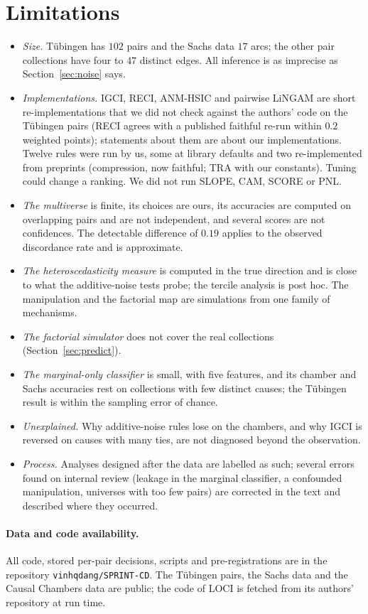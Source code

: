 \section{Limitations}\label{sec:limits}
\begin{itemize}
\item \emph{Size.} T\"ubingen has $102$ pairs and the Sachs data $17$ arcs; the other pair collections have four to $47$ distinct edges. All inference is as imprecise as Section~\ref{sec:noise} says.
\item \emph{Implementations.} IGCI, RECI, ANM-HSIC and pairwise LiNGAM are short re-implementations that we did not check against the authors' code on the T\"ubingen pairs (RECI agrees with a published faithful re-run within $0.2$ weighted points); statements about them are about our implementations. Twelve rules were run by us, some at library defaults and two re-implemented from preprints (compression, now faithful; TRA with our constants). Tuning could change a ranking. We did not run SLOPE, CAM, SCORE or PNL.
\item \emph{The multiverse} is finite, its choices are ours, its accuracies are computed on overlapping pairs and are not independent, and several scores are not confidences. The detectable difference of $0.19$ applies to the observed discordance rate and is approximate.
\item \emph{The heteroscedasticity measure} is computed in the true direction and is close to what the additive-noise tests probe; the tercile analysis is post hoc. The manipulation and the factorial map are simulations from one family of mechanisms.
\item \emph{The factorial simulator} does not cover the real collections (Section~\ref{sec:predict}).
\item \emph{The marginal-only classifier} is small, with five features, and its chamber and Sachs accuracies rest on collections with few distinct causes; the T\"ubingen result is within the sampling error of chance.
\item \emph{Unexplained.} Why additive-noise rules lose on the chambers, and why IGCI is reversed on causes with many ties, are not diagnosed beyond the observation.
\item \emph{Process.} Analyses designed after the data are labelled as such; several errors found on internal review (leakage in the marginal classifier, a confounded manipulation, universes with too few pairs) are corrected in the text and described where they occurred.
\end{itemize}

\paragraph{Data and code availability.} All code, stored per-pair decisions, scripts and pre-registrations are in the repository \texttt{vinhqdang/SPRINT-CD}. The T\"ubingen pairs, the Sachs data and the Causal Chambers data are public; the code of LOCI is fetched from its authors' repository at run time.
